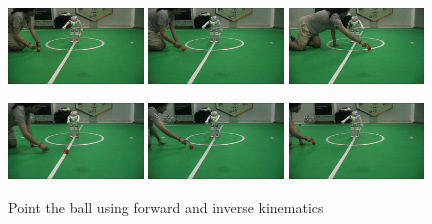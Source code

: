 \begin{figure}[!h]
\centerline{
\includegraphics[width=0.32\textwidth]{Figures/Demo1/1.png}
\includegraphics[width=0.32\textwidth]{Figures/Demo1/2.png}
\includegraphics[width=0.32\textwidth]{Figures/Demo1/3.png}
}
\vspace*{0.06cm}
\centerline{
\includegraphics[width=0.32\textwidth]{Figures/Demo1/4.png}
\includegraphics[width=0.32\textwidth]{Figures/Demo1/5.png}
\includegraphics[width=0.32\textwidth]{Figures/Demo1/6.png}
}
\vspace{-0.1cm}
\caption{Point the ball using forward and inverse kinematics}
\label{demo1}
\vspace*{0.5cm}
\end{figure}

